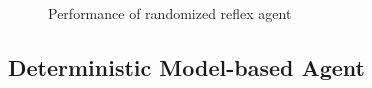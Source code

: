 \begin{figure}[!h]
        \centering
        \hspace{0.5in}
        \caption{Performance of randomized reflex agent}\label{fig:agent2}
\end{figure}

\subsection{Deterministic Model-based Agent}

